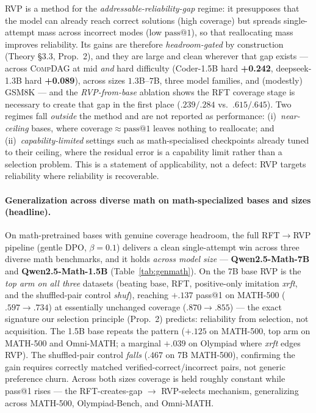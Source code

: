 RVP is a method for the \emph{addressable-reliability-gap} regime: it presupposes
that the model can already reach correct solutions (high coverage) but spreads
single-attempt mass across incorrect modes (low $\text{pass}@1$), so that
reallocating mass improves reliability. Its gains are therefore \emph{headroom-gated}
by construction (Theory \S3.3, Prop.~2), and they are large and clean wherever that
gap exists --- across \textsc{CompDAG} at mid \emph{and} hard difficulty (Coder-1.5B
hard \textbf{+0.242}, deepseek-1.3B hard \textbf{+0.089}), across sizes $1.3$B--$7$B,
three model families, and (modestly) GSM8K --- and the \emph{RVP-from-base} ablation
shows the RFT coverage stage is necessary to create that gap in the first place
($.239/.284$ vs.\ $.615/.645$). Two regimes fall \emph{outside} the method and are
not reported as performance: (i)~\emph{near-ceiling} bases, where coverage$\approx
\text{pass}@1$ leaves nothing to reallocate; and (ii)~\emph{capability-limited}
settings such as math-specialised checkpoints already tuned to their ceiling, where
the residual error is a capability limit rather than a selection problem. This is a
statement of applicability, not a defect: RVP targets reliability where reliability
is recoverable.

\paragraph{Generalization across diverse math on math-specialized bases and sizes (headline).}
On math-pretrained bases with genuine coverage headroom, the full RFT$\to$RVP pipeline (gentle
DPO, $\beta{=}0.1$) delivers a clean single-attempt win across three diverse math benchmarks, and
it holds \emph{across model size} --- \textbf{Qwen2.5-Math-7B} and \textbf{Qwen2.5-Math-1.5B}
(Table~\ref{tab:genmath}). On the 7B base RVP is the \emph{top arm on all three} datasets
(beating base, RFT, positive-only imitation \emph{xrft}, and the shuffled-pair control
\emph{shuf}), reaching $+.137$ pass@1 on MATH-500 ($.597\!\to\!.734$) at essentially unchanged
coverage ($.870\!\to\!.855$) --- the exact signature our selection principle (Prop.~2) predicts:
reliability from selection, not acquisition. The 1.5B base repeats the pattern ($+.125$ on
MATH-500, top arm on MATH-500 and Omni-MATH; a marginal $+.039$ on Olympiad where \emph{xrft}
edges RVP). The shuffled-pair control \emph{falls} ($.467$ on 7B MATH-500), confirming the gain
requires correctly matched verified-correct/incorrect pairs, not generic preference churn. Across
both sizes coverage is held roughly constant while pass@1 rises --- the RFT-creates-gap
$\to$ RVP-selects mechanism, generalizing across MATH-500, Olympiad-Bench, and Omni-MATH.

